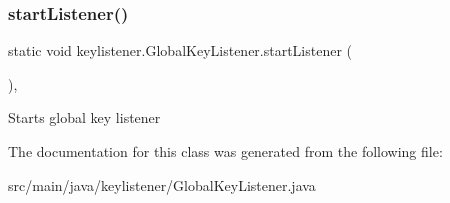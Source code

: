 \subsubsection{\texorpdfstring{start\+Listener()}{startListener()}}
{\footnotesize\ttfamily static void keylistener.\+Global\+Key\+Listener.\+start\+Listener (\begin{DoxyParamCaption}{ }\end{DoxyParamCaption})\hspace{0.3cm}{\ttfamily [static]}, {\ttfamily [private]}}

Starts global key listener 

The documentation for this class was generated from the following file\+:\begin{DoxyCompactItemize}
\item 
src/main/java/keylistener/Global\+Key\+Listener.\+java\end{DoxyCompactItemize}
